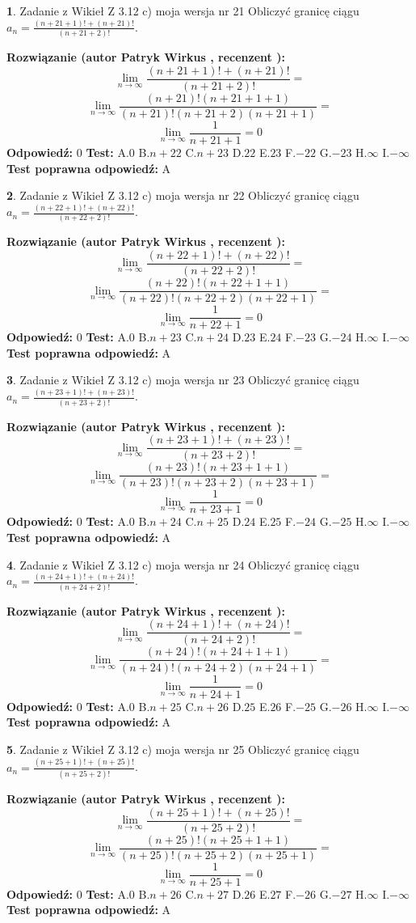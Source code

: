 \documentclass[12pt, a4paper]{article}
\theoremstyle{definition} %
\newtheorem{zad}{}
\newcommand{\zadStart}[1]{\begin{zad}#1\newline}
\newcommand{\zadStop}{\end{zad}}
\newcommand{\rozwStart}[2]{\noindent \textbf{Rozwiązanie (autor #1 , recenzent #2): }\newline}
\newcommand{\rozwStop}{\newline}
\newcommand{\odpStart}{\noindent \textbf{Odpowiedź:}\newline}
\newcommand{\odpStop}{\newline}
\newcommand{\testStart}{\noindent \textbf{Test:}\newline}
\newcommand{\testStop}{\newline}
\newcommand{\kluczStart}{\noindent \textbf{Test poprawna odpowiedź:}\newline}
\newcommand{\kluczStop}{\newline}
\begin{document}
\zadStart{Zadanie z Wikieł Z 3.12 c) moja wersja nr 21}
Obliczyć granicę ciągu $a_{n}=\frac{(n+21+1)!+(n+21)!}{(n+21+2)!}$.
\zadStop
\rozwStart{Patryk Wirkus}{}
$$\lim\limits_{n\to\infty}\frac{(n+21+1)!+(n+21)!}{(n+21+2)!}=$$
$$\lim\limits_{n\to\infty}\frac{(n+21)!(n+21+1+1)}{(n+21)!(n+21+2)(n+21+1)}=$$
$$\lim\limits_{n\to\infty}\frac{1}{n+21+1}= 0$$
\rozwStop
\odpStart
$0$
\odpStop
\testStart
A.$0$
B.$n+22$
C.$n+23$
D.$22$
E.$23$
F.$-22$
G.$-23$
H.$\infty$
I.$-\infty$
\testStop
\kluczStart
A
\kluczStop



\zadStart{Zadanie z Wikieł Z 3.12 c) moja wersja nr 22}
Obliczyć granicę ciągu $a_{n}=\frac{(n+22+1)!+(n+22)!}{(n+22+2)!}$.
\zadStop
\rozwStart{Patryk Wirkus}{}
$$\lim\limits_{n\to\infty}\frac{(n+22+1)!+(n+22)!}{(n+22+2)!}=$$
$$\lim\limits_{n\to\infty}\frac{(n+22)!(n+22+1+1)}{(n+22)!(n+22+2)(n+22+1)}=$$
$$\lim\limits_{n\to\infty}\frac{1}{n+22+1}= 0$$
\rozwStop
\odpStart
$0$
\odpStop
\testStart
A.$0$
B.$n+23$
C.$n+24$
D.$23$
E.$24$
F.$-23$
G.$-24$
H.$\infty$
I.$-\infty$
\testStop
\kluczStart
A
\kluczStop



\zadStart{Zadanie z Wikieł Z 3.12 c) moja wersja nr 23}
Obliczyć granicę ciągu $a_{n}=\frac{(n+23+1)!+(n+23)!}{(n+23+2)!}$.
\zadStop
\rozwStart{Patryk Wirkus}{}
$$\lim\limits_{n\to\infty}\frac{(n+23+1)!+(n+23)!}{(n+23+2)!}=$$
$$\lim\limits_{n\to\infty}\frac{(n+23)!(n+23+1+1)}{(n+23)!(n+23+2)(n+23+1)}=$$
$$\lim\limits_{n\to\infty}\frac{1}{n+23+1}= 0$$
\rozwStop
\odpStart
$0$
\odpStop
\testStart
A.$0$
B.$n+24$
C.$n+25$
D.$24$
E.$25$
F.$-24$
G.$-25$
H.$\infty$
I.$-\infty$
\testStop
\kluczStart
A
\kluczStop



\zadStart{Zadanie z Wikieł Z 3.12 c) moja wersja nr 24}
Obliczyć granicę ciągu $a_{n}=\frac{(n+24+1)!+(n+24)!}{(n+24+2)!}$.
\zadStop
\rozwStart{Patryk Wirkus}{}
$$\lim\limits_{n\to\infty}\frac{(n+24+1)!+(n+24)!}{(n+24+2)!}=$$
$$\lim\limits_{n\to\infty}\frac{(n+24)!(n+24+1+1)}{(n+24)!(n+24+2)(n+24+1)}=$$
$$\lim\limits_{n\to\infty}\frac{1}{n+24+1}= 0$$
\rozwStop
\odpStart
$0$
\odpStop
\testStart
A.$0$
B.$n+25$
C.$n+26$
D.$25$
E.$26$
F.$-25$
G.$-26$
H.$\infty$
I.$-\infty$
\testStop
\kluczStart
A
\kluczStop



\zadStart{Zadanie z Wikieł Z 3.12 c) moja wersja nr 25}
Obliczyć granicę ciągu $a_{n}=\frac{(n+25+1)!+(n+25)!}{(n+25+2)!}$.
\zadStop
\rozwStart{Patryk Wirkus}{}
$$\lim\limits_{n\to\infty}\frac{(n+25+1)!+(n+25)!}{(n+25+2)!}=$$
$$\lim\limits_{n\to\infty}\frac{(n+25)!(n+25+1+1)}{(n+25)!(n+25+2)(n+25+1)}=$$
$$\lim\limits_{n\to\infty}\frac{1}{n+25+1}= 0$$
\rozwStop
\odpStart
$0$
\odpStop
\testStart
A.$0$
B.$n+26$
C.$n+27$
D.$26$
E.$27$
F.$-26$
G.$-27$
H.$\infty$
I.$-\infty$
\testStop
\kluczStart
A
\kluczStop
\end{document}
